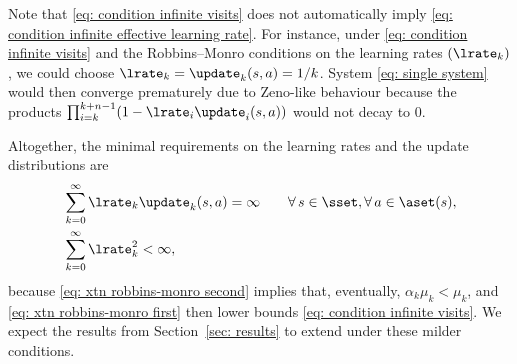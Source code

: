 % 
% 
Note that \eqref{eq: condition infinite visits} does not automatically imply \eqref{eq: condition infinite effective learning rate}.
For instance, under \eqref{eq: condition infinite visits} and the Robbins--Monro conditions on the learning rates $(\lrate_k)$, we could choose $\lrate_k = \update_k(s,a) = 1/k$. System \eqref{eq: single system} would then converge prematurely due to Zeno-like behaviour because the products $\prod_{i=k}^{k+n-1} (1-\lrate_i \update_i(s,a))$ would not decay to 0.


Altogether, the minimal requirements on the learning rates and the update distributions are
\begin{align}
    \label{eq: xtn robbins-monro first}
    &\sum_{k =0}^\infty \lrate_k \update_k(s,a) = \infty 
    \qquad \forall \, s \in \sset, \forall \, a \in \aset(s) ,
    \\
    \label{eq: xtn robbins-monro second}
    &\sum_{k =0}^\infty \lrate_k^2 < \infty ,
\end{align}
because \eqref{eq: xtn robbins-monro second} implies that, eventually, $\alpha_k \mu_k < \mu_k$, and \eqref{eq: xtn robbins-monro first} then lower bounds \eqref{eq: condition infinite visits}.
We expect the results from Section~\ref{sec: results} to extend under these milder conditions.


